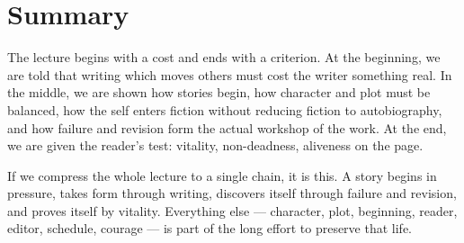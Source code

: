 \section{Summary}

The lecture begins with a cost and ends with a criterion. At the beginning, we are told that writing which moves others must cost the writer something real. In the middle, we are shown how stories begin, how character and plot must be balanced, how the self enters fiction without reducing fiction to autobiography, and how failure and revision form the actual workshop of the work. At the end, we are given the reader's test: vitality, non-deadness, aliveness on the page.

If we compress the whole lecture to a single chain, it is this. A story begins in pressure, takes form through writing, discovers itself through failure and revision, and proves itself by vitality. Everything else --- character, plot, beginning, reader, editor, schedule, courage --- is part of the long effort to preserve that life.